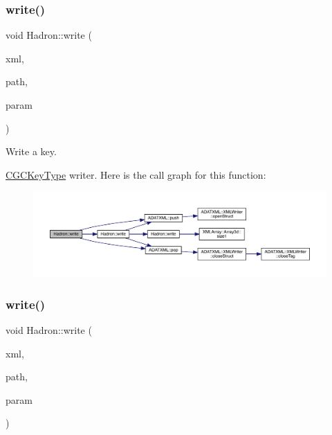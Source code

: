 \subsubsection{\texorpdfstring{write()}{write()}\hspace{0.1cm}{\footnotesize\ttfamily [4/95]}}
{\footnotesize\ttfamily void Hadron\+::write (\begin{DoxyParamCaption}\item[{\mbox{\hyperlink{classADATXML_1_1XMLWriter}{X\+M\+L\+Writer}} \&}]{xml,  }\item[{const std\+::string \&}]{path,  }\item[{const \mbox{\hyperlink{structHadron_1_1KeyCGCSU3__t}{Key\+C\+G\+C\+S\+U3\+\_\+t}} \&}]{param }\end{DoxyParamCaption})}



Write a key. 

\mbox{\hyperlink{structHadron_1_1CGCKeyType}{C\+G\+C\+Key\+Type}} writer. Here is the call graph for this function\+:
\nopagebreak
\begin{figure}[H]
\begin{center}
\leavevmode
\includegraphics[width=350pt]{d1/daf/namespaceHadron_a1df6238e1c6eca70a3e05655f2680904_cgraph}
\end{center}
\end{figure}
\mbox{\label{namespaceHadron_a7da51caa70247c9ab9d11f8275ec93b7}} 
\subsubsection{\texorpdfstring{write()}{write()}\hspace{0.1cm}{\footnotesize\ttfamily [5/95]}}
{\footnotesize\ttfamily void Hadron\+::write (\begin{DoxyParamCaption}\item[{\mbox{\hyperlink{classADATXML_1_1XMLWriter}{X\+M\+L\+Writer}} \&}]{xml,  }\item[{const std\+::string \&}]{path,  }\item[{const \mbox{\hyperlink{structHadron_1_1QuarkNum__t}{Quark\+Num\+\_\+t}} \&}]{param }\end{DoxyParamCaption})}



